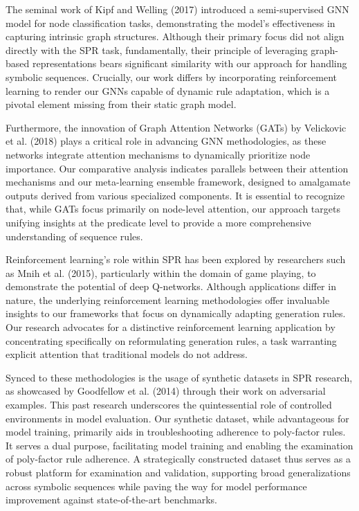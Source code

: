 \documentclass{article}
\begin{document}
The seminal work of Kipf and Welling (2017) introduced a semi-supervised GNN model for node classification tasks, demonstrating the model's effectiveness in capturing intrinsic graph structures. Although their primary focus did not align directly with the SPR task, fundamentally, their principle of leveraging graph-based representations bears significant similarity with our approach for handling symbolic sequences. Crucially, our work differs by incorporating reinforcement learning to render our GNNs capable of dynamic rule adaptation, which is a pivotal element missing from their static graph model.

Furthermore, the innovation of Graph Attention Networks (GATs) by Velickovic et al. (2018) plays a critical role in advancing GNN methodologies, as these networks integrate attention mechanisms to dynamically prioritize node importance. Our comparative analysis indicates parallels between their attention mechanisms and our meta-learning ensemble framework, designed to amalgamate outputs derived from various specialized components. It is essential to recognize that, while GATs focus primarily on node-level attention, our approach targets unifying insights at the predicate level to provide a more comprehensive understanding of sequence rules.

Reinforcement learning's role within SPR has been explored by researchers such as Mnih et al. (2015), particularly within the domain of game playing, to demonstrate the potential of deep Q-networks. Although applications differ in nature, the underlying reinforcement learning methodologies offer invaluable insights to our frameworks that focus on dynamically adapting generation rules. Our research advocates for a distinctive reinforcement learning application by concentrating specifically on reformulating generation rules, a task warranting explicit attention that traditional models do not address.

Synced to these methodologies is the usage of synthetic datasets in SPR research, as showcased by Goodfellow et al. (2014) through their work on adversarial examples. This past research underscores the quintessential role of controlled environments in model evaluation. Our synthetic dataset, while advantageous for model training, primarily aids in troubleshooting adherence to poly-factor rules. It serves a dual purpose, facilitating model training and enabling the examination of poly-factor rule adherence. A strategically constructed dataset thus serves as a robust platform for examination and validation, supporting broad generalizations across symbolic sequences while paving the way for model performance improvement against state-of-the-art benchmarks.
\end{document}
